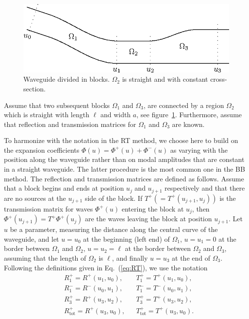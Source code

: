 \documentclass{svjour3}
\renewcommand{\Phi}{\varPhi}
\renewcommand{\vec}[1]{\bm{#1}}
\renewcommand{\Phi}{\varPhi}
\newcommand{\Ttot}{T^+_{\text{tot}}}
\newcommand{\Rtot}{R^+_{\text{tot}}}
\begin{document}
\begin{figure}[t]
  \centering
  \includegraphics[width=\textwidth]{BBMwg-1}
  \caption{Waveguide divided in blocks. $\Omega_2$ is straight and
    with constant cross-section.}
  \label{fig:wg4}
\end{figure}


Assume that two subsequent blocks $\Omega_1$ and $\Omega_3$, are
connected by a region $\Omega_2$ which is straight with length $\ell$
and width $a$, see figure~\ref{fig:wg4}.  Furthermore, assume that
reflection and transmission matrices for $\Omega_1$ and $\Omega_3$ are
known.

To harmonize with the notation in the RT method, we choose here to
build on the expansion coefficients
$\vec\Phi(u)=\vec\Phi^+(u)+\vec\Phi^-(u)$ as varying with the position
along the waveguide rather than on modal amplitudes that are constant
in a straight waveguide. The latter procedure is the most common one
in the BB method. The reflection and transmission matrices are defined as
follows. Assume that a block begins and ends at position $u_j$ and
$u_{j+1}$ respectively and that there are no sources at the $u_{j+1}$
side of the block. If $T^+(=T^+(u_{j+1},u_j))$ is the transmission
matrix for waves $\vec\Phi^+(u)$ entering the block at $u_{j}$, then
$\vec\Phi^+(u_{j+1})=T^+\vec\Phi^+(u_{j})$ are the waves leaving the
block at position $u_{j+1}$. Let $u$ be a parameter, measuring the
distance along the central curve of the waveguide, and let $u=u_0$ at
the beginning (left end) of $\Omega_1$, $u=u_1=0$ at the border
between $\Omega_1$ and $\Omega_2$, $u=u_2=\ell$ at the border between
$\Omega_2$ and $\Omega_3$, assuming that the length of $\Omega_2$ is
$\ell$, and finally $u=u_3$ at the end of $\Omega_3$. Following the
definitions given in Eq.~(\ref{eq:RT}), we use the notation
\begin{align*}
  &R^+_1=R^+(u_1,u_0),&&T^+_1=T^+(u_1,u_0),\\
  &R^-_1=R^-(u_0,u_1),&&T^-_1=T^-(u_0,u_1),\\
  &R^+_3=R^+(u_3,u_2),&&T^+_3=T^+(u_3,u_2),\\
  &\Rtot=R^+(u_3,u_0),&&\Ttot=T^+(u_3,u_0).
\end{align*}
\end{document}
